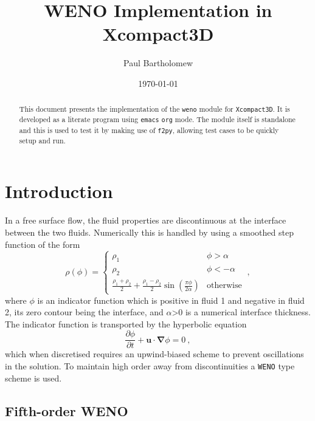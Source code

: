 \documentclass[11pt]{article}
\author{Paul Bartholomew}
\date{\today}
\title{WENO Implementation in Xcompact3D}
\begin{document}
\maketitle
\begin{abstract}
This document presents the implementation of the \texttt{weno} module for \texttt{Xcompact3D}.
It is developed as a literate program using \texttt{emacs} \texttt{org} mode.
The module itself is standalone and this is used to test it by making use of \texttt{f2py}, allowing test
cases to be quickly setup and run.
\end{abstract}
\setcounter{tocdepth}{2}
\tableofcontents

\section{Introduction}
\label{sec:org7581e9f}

In a free surface flow, the fluid properties are discontinuous at the interface between the two
fluids.
Numerically this is handled by using a smoothed step function of the form
\begin{equation}
  \rho \left( \phi \right) =
  \begin{cases}
    \rho_1 & \phi > \alpha \\ 
    \rho_2 & \phi < -\alpha \\
    \frac{\rho_1 + \rho_2}{2} + \frac{\rho_1 - \rho_2}{2} \sin\left( \frac{\pi\phi}{2\alpha} \right)
    & \mbox{otherwise}
  \end{cases} \ ,
\end{equation}
where \(\phi\) is an indicator function which is positive in fluid 1 and negative in fluid 2, its zero
contour being the interface, and \(\alpha\)>0 is a numerical interface thickness.
The indicator function is transported by the hyperbolic equation
\begin{equation}
  \frac{\partial\phi}{\partial t} + \boldsymbol{u}\cdot\boldsymbol{\nabla}\phi = 0 \ ,
\end{equation}
which when discretised requires an upwind-biased scheme to prevent oscillations in the solution.
To maintain high order away from discontinuities a \texttt{WENO} type scheme is used.

\subsection{Fifth-order WENO}
\label{sec:org905dba2}
\end{document}
